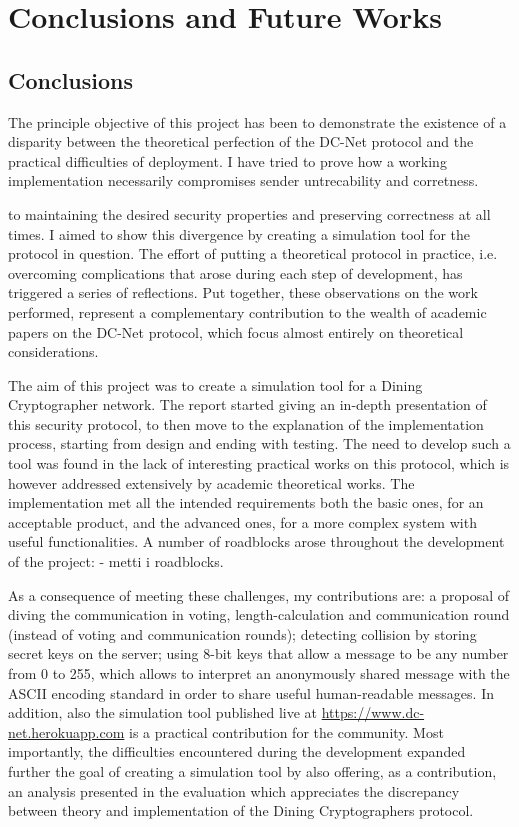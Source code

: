 \chapter{Conclusions and Future Works}

\section{Conclusions}

The principle objective of this project has been to demonstrate the existence of a disparity between the theoretical perfection of the DC-Net protocol and the practical difficulties of deployment. I have tried to prove how a working implementation necessarily compromises sender untrecability and corretness. 

to maintaining the desired security properties and preserving correctness at all times. I aimed to show this divergence by creating a simulation tool for the protocol in question. The effort of putting a theoretical protocol in practice, i.e. overcoming complications that arose during each step of development, has triggered a series of reflections. Put together, these observations on the work performed, represent a complementary contribution to the wealth of academic papers on the DC-Net protocol, which focus almost entirely on theoretical considerations.


The aim of this project was to create a simulation tool for a Dining Cryptographer network. The report started giving an in-depth presentation of this security protocol, to then move to the explanation of the implementation process, starting from design and ending with testing. The need to develop such a tool was found in the lack of interesting practical works on this protocol, which is however addressed extensively by academic theoretical works. The implementation met all the intended requirements both the basic ones, for an acceptable product, and the advanced ones, for a more complex system with useful functionalities. A number of roadblocks arose throughout the development of the project: - metti i roadblocks. 

As a consequence of meeting these challenges, my contributions are: a proposal of diving the communication in voting, length-calculation and communication round (instead of voting and communication rounds); detecting collision by storing secret keys on the server; using 8-bit keys that allow a message to be any number from 0 to 255, which allows to interpret an anonymously shared message with the ASCII encoding standard in order to share useful human-readable messages. In addition, also the simulation tool published live at \url{https://www.dc-net.herokuapp.com} is a practical contribution for the community. Most importantly, the difficulties encountered during the development expanded further the goal of creating a simulation tool by also offering, as a contribution, an analysis presented in the evaluation which appreciates the discrepancy between theory and implementation of the Dining Cryptographers protocol.

